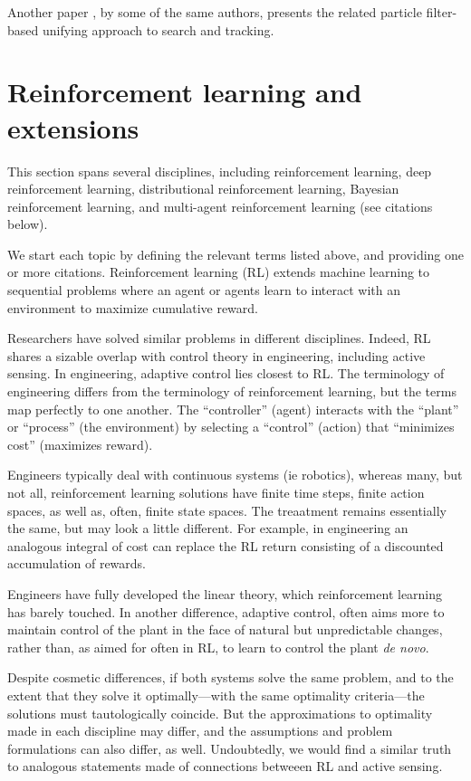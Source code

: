 \documentclass{article}
\begin{document}
Another paper \cite{tisdale2008multiple}, by some of the same authors,
presents the related particle filter-based unifying approach to search
and tracking.


\section{Reinforcement learning and extensions}

This section spans several disciplines, including reinforcement
learning, deep reinforcement learning, distributional reinforcement
learning, Bayesian reinforcement learning, and multi-agent
reinforcement learning (see citations below).

We start each topic by defining the relevant terms listed above, and
providing one or more citations.  Reinforcement learning (RL)
\cite{sutton2018reinforcement, kaelbling1996reinforcement} extends
machine learning to sequential problems where an agent or agents learn
to interact with an environment to maximize cumulative reward.

Researchers have solved similar problems in different disciplines.
Indeed, RL shares a sizable overlap with control theory in
engineering, including active sensing.  In engineering, adaptive
control \cite{aastrom2013adaptive, khan2012reinforcement} lies closest
to RL.  The terminology of engineering differs from the terminology of
reinforcement learning, but the terms map perfectly to one another.
The ``controller'' (agent) interacts with the ``plant'' or ``process''
(the environment) by selecting a ``control'' (action) that ``minimizes
cost'' (maximizes reward).

Engineers typically deal with continuous systems (ie robotics),
whereas many, but not all, reinforcement learning solutions have
finite time steps, finite action spaces, as well as, often, finite
state spaces.  The treaatment remains essentially the same, but may
look a little different.  For example, in engineering an analogous
integral of cost can replace the RL return consisting of a discounted
accumulation of rewards.

Engineers have fully developed the linear theory, which reinforcement
learning has barely touched.  In another difference, adaptive control,
often aims more to maintain control of the plant in the face of
natural but unpredictable changes, rather than, as aimed for often in
RL, to learn to control the plant \emph{de novo}.

Despite cosmetic differences, if both systems solve the same problem,
and to the extent that they solve it optimally---with the same
optimality criteria---the solutions must tautologically coincide.  But
the approximations to optimality made in each discipline may differ,
and the assumptions and problem formulations can also differ, as well.
Undoubtedly, we would find a similar truth to analogous statements
made of connections betweeen RL and active sensing.
\end{document}
